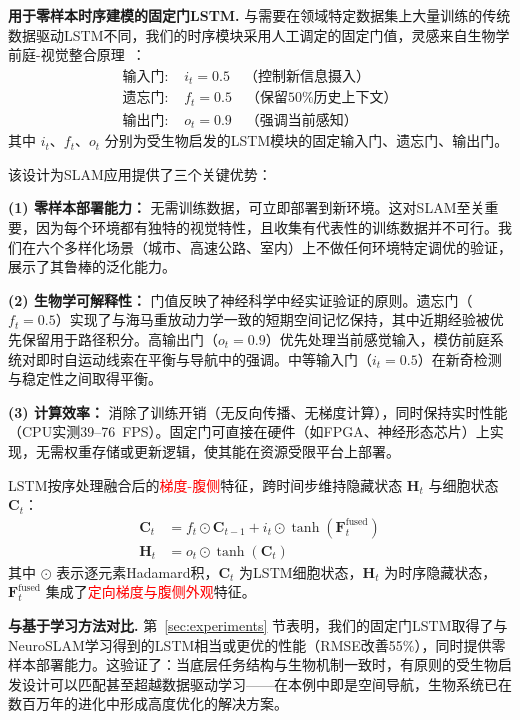 \textbf{用于零样本时序建模的固定门LSTM.}
与需要在领域特定数据集上大量训练的传统数据驱动LSTM不同，我们的时序模块采用人工调定的固定门值，灵感来自生物学前庭-视觉整合原理~\cite{Angelaki2004, Cullen2012}：
\begin{align}
    \text{输入门: }  & i_t = 0.5 \quad \text{（控制新信息摄入）} \\
    \text{遗忘门: } & f_t = 0.5 \quad \text{（保留50\%历史上下文）} \\
    \text{输出门: } & o_t = 0.9 \quad \text{（强调当前感知）}
\end{align}
其中 $i_t$、$f_t$、$o_t$ 分别为受生物启发的LSTM模块的固定输入门、遗忘门、输出门。

该设计为SLAM应用提供了三个关键优势：

\textbf{(1) 零样本部署能力：} 无需训练数据，可立即部署到新环境。这对SLAM至关重要，因为每个环境都有独特的视觉特性，且收集有代表性的训练数据并不可行。我们在六个多样化场景（城市、高速公路、室内）上不做任何环境特定调优的验证，展示了其鲁棒的泛化能力。

\textbf{(2) 生物学可解释性：} 门值反映了神经科学中经实证验证的原则。遗忘门（$f_t=0.5$）实现了与海马重放动力学一致的短期空间记忆保持，其中近期经验被优先保留用于路径积分。高输出门（$o_t=0.9$）优先处理当前感觉输入，模仿前庭系统对即时自运动线索在平衡与导航中的强调。中等输入门（$i_t=0.5$）在新奇检测与稳定性之间取得平衡。

\textbf{(3) 计算效率：} 消除了训练开销（无反向传播、无梯度计算），同时保持实时性能（CPU实测39--76~FPS）。固定门可直接在硬件（如FPGA、神经形态芯片）上实现，无需权重存储或更新逻辑，使其能在资源受限平台上部署。

LSTM按序处理融合后的\textcolor{red}{梯度-腹侧}特征，跨时间步维持隐藏状态 $\mathbf{H}_t$ 与细胞状态 $\mathbf{C}_t$：
\begin{align}
    \mathbf{C}_t & = f_t \odot \mathbf{C}_{t-1} + i_t \odot \tanh(\mathbf{F}^{\text{fused}}_t) \\
    \mathbf{H}_t & = o_t \odot \tanh(\mathbf{C}_t)
\end{align}
其中 $\odot$ 表示逐元素Hadamard积，$\mathbf{C}_t$ 为LSTM细胞状态，$\mathbf{H}_t$ 为时序隐藏状态，$\mathbf{F}^{\text{fused}}_t$ 集成了\textcolor{red}{定向梯度与腹侧外观}特征。

\textbf{与基于学习方法对比.} 第~\ref{sec:experiments} 节表明，我们的固定门LSTM取得了与NeuroSLAM学习得到的LSTM相当或更优的性能（RMSE改善55\%），同时提供零样本部署能力。这验证了：当底层任务结构与生物机制一致时，有原则的受生物启发设计可以匹配甚至超越数据驱动学习——在本例中即是空间导航，生物系统已在数百万年的进化中形成高度优化的解决方案。

